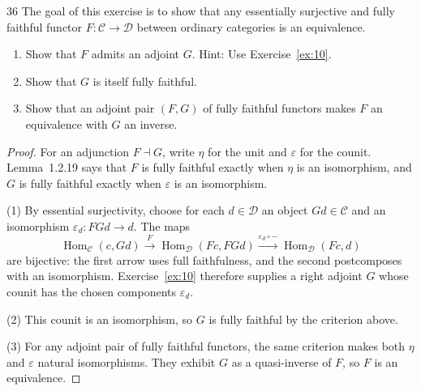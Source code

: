\begin{exercise}{36}
The goal of this exercise is to show that any essentially surjective and fully
faithful functor $F\colon\mathcal C\to\mathcal D$ between ordinary categories is an equivalence.
\begin{enumerate}[label=(\arabic*),leftmargin=*,itemsep=0pt,parsep=0pt,
                  topsep=.5\baselineskip]
 \item Show that $F$ admits an adjoint $G$. Hint: Use Exercise~\ref{ex:10}.
 \item Show that $G$ is itself fully faithful.
 \item Show that an adjoint pair $(F,G)$ of fully faithful functors makes $F$ an equivalence with
       $G$ an inverse.
\end{enumerate}

\begin{proof}
For an adjunction $F\dashv G$, write $\eta$ for the unit and
$\varepsilon$ for the counit. Lemma~1.2.19 says that $F$ is
fully faithful exactly when $\eta$ is an isomorphism, and $G$
is fully faithful exactly when $\varepsilon$ is an isomorphism.

(1) By essential surjectivity, choose for each $d\in\mathcal D$
an object $Gd\in\mathcal C$ and an isomorphism
$\varepsilon_d\colon FGd\to d$.
The maps
\[
 \operatorname{Hom}_{\mathcal C}(c,Gd)
 \xrightarrow{F}\operatorname{Hom}_{\mathcal D}(Fc,FGd)
 \xrightarrow{\varepsilon_d\circ-}
 \operatorname{Hom}_{\mathcal D}(Fc,d)
\]
are bijective: the first arrow uses full faithfulness, and
the second postcomposes with an isomorphism.
Exercise~\ref{ex:10} therefore supplies a right adjoint $G$
whose counit has the chosen components $\varepsilon_d$.

(2) This counit is an isomorphism, so $G$ is fully faithful
by the criterion above.

(3) For any adjoint pair of fully faithful functors, the same
criterion makes both $\eta$ and $\varepsilon$ natural
isomorphisms. They exhibit $G$ as a quasi-inverse of $F$,
so $F$ is an equivalence.
\end{proof}
\end{exercise}

